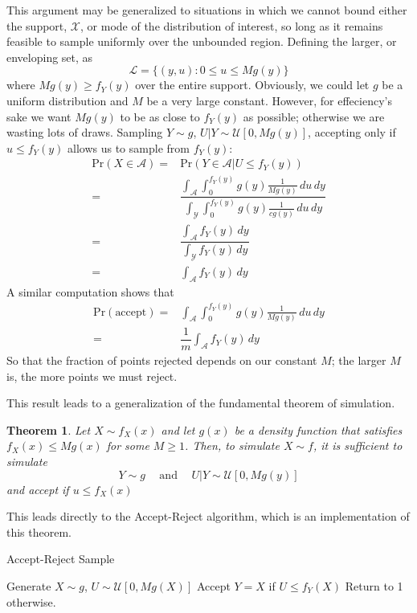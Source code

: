 \documentclass[11pt, a4paper]{article}
\theoremstyle{plain}
\newtheorem{thm}{Theorem}[section] %
\theoremstyle{definition}
\newcommand{\pr}{\mathrm{Pr}}
\begin{document}
This argument may be generalized to situations in which we cannot
bound either the support, $\mathcal{X}$, or mode of the distribution of interest,
so long as it remains feasible to sample uniformly over the unbounded
region. Defining the larger, or enveloping set, as
$$\mathscr{L} = \{(y, u) : 0 \le u \le Mg(y)\}$$
where $Mg(y) \ge f_Y(y)$ over the entire support. Obviously, we
could let $g$ be a uniform distribution and $M$ be a very large constant.
However, for effeciency's sake we want $Mg(y)$ to be as 
close to $f_Y(y)$ as possible; otherwise we are wasting lots of draws. Sampling
$Y \sim g$, $U |Y \sim\mathcal{U}[0, Mg(y)]$, accepting only if
$u \le f_Y(y)$ allows us to sample from $f_Y(y)$:
\begin{align*}
\pr(X \in \mathcal{A}) ={}& \pr(Y \in \mathcal{A} | U \le f_Y(y))\\
={}& \dfrac{\int_{\mathcal{A}}\int_0^{f_Y(y)} g(y) \frac{1}{Mg(y)} \, du\,dy}{
\int_{\mathcal{Y}}\int_0^{f_Y(y)} g(y) \frac{1}{cg(y)} \, du\,dy
}\\
={}& \dfrac{\int_{\mathcal{A}}f_Y(y)\,dy}{\int_{\mathcal{Y}}f_Y(y)\,dy}\\
={}& \int_{\mathcal{A}}f_Y(y)\,dy
\end{align*}
A similar computation shows that
\begin{align*}
\pr(\mbox{accept}) = {}& \int_{\mathcal{A}}\int_0^{f_Y(y)} g(y) \frac{1}{Mg(y)} \, du\,dy\\
={}& \dfrac{1}{m} \int_{\mathcal{A}}f_Y(y)\,dy
\end{align*}
So that the fraction of points rejected depends on our constant $M$; the larger
$M$ is, the more points we must reject.

This result leads to a generalization of the fundamental theorem of
simulation.
\begin{thm}
Let $X \sim f_X(x)$ and let $g(x)$ be a density function that satisfies
$f_X(x) \le Mg(x)$ for some $M \ge 1$. Then, to simulate $X \sim f$, it
is sufficient to simulate
$$Y \sim g\hspace{15pt}\mbox{and}\hspace{15pt} U | Y \sim \mathcal{U}[0, Mg(y)]$$
and accept if $u \le f_X(x)$
\end{thm}
This leads directly to the Accept-Reject algorithm, which is an implementation
of this theorem.
\begin{algorithm}
\caption{Accept-Reject Sample}
\begin{algorithmic}[1]
\Procedure{}{}
\State Generate $X \sim g$, $U \sim \mathcal{U}[0, Mg(X)]$
\State Accept $Y = X$ if $U \le f_Y(X)$
\State Return to 1 otherwise.
\EndProcedure
\end{algorithmic}
\end{algorithm}
\end{document}
